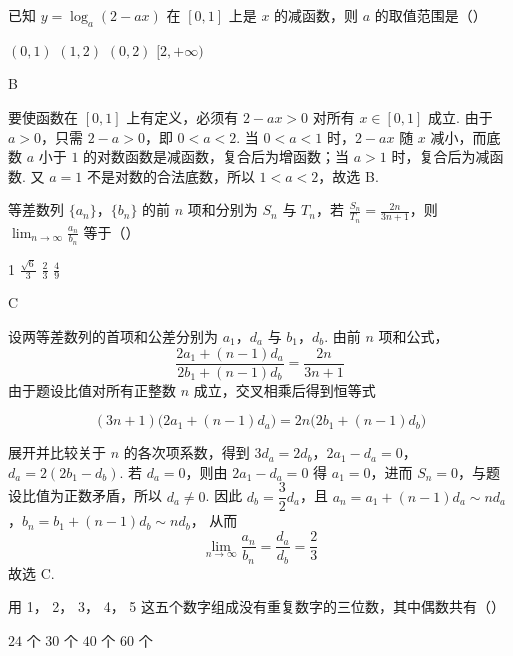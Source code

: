 \begin{problem}
已知 \(y = \log_a(2 - ax) \) 在 \([0,1]\) 上是 \(x \) 的减函数，则 \(a \) 的取值范围是（\quad）

\choices
    {\((0,1)\)}
    {\((1,2)\)}
    {\((0,2)\)}
    {\([2, +\infty)\)}
\end{problem}

\begin{answer}
B
\end{answer}

\begin{solution}
要使函数在 \([0,1]\) 上有定义，必须有 \(2-ax>0\) 对所有 \(x\in[0,1]\) 成立. 由于 \(a>0\)，只需 \(2-a>0\)，即 \(0<a<2\). 当 \(0<a<1\) 时，\(2-ax\) 随 \(x\) 减小，而底数 \(a\) 小于 \(1\) 的对数函数是减函数，复合后为增函数；当 \(a>1\) 时，复合后为减函数. 又 \(a=1\) 不是对数的合法底数，所以 \(1<a<2\)，故选 B.
\end{solution}

\begin{problem}
等差数列 \(\{a_{n}\}\)，\(\{b_{n}\}\) 的前 \(n\) 项和分别为 \(S_{n}\) 与 \(T_{n}\)，若 \(\frac{S_{n}}{T_{n}} = \frac{2n}{3n+1}\)，则 \(\displaystyle\lim_{n \to \infty} \frac{a_{n}}{b_{n}}\) 等于（\quad）

\choices
    {1}
    {\(\frac{\sqrt{6}}{3} \)}
    {\(\frac{2}{3} \)}
    {\(\frac{4}{9} \)}
\end{problem}

\begin{answer}
C
\end{answer}

\begin{solution}
设两等差数列的首项和公差分别为 \(a_1\)，\(d_a\) 与 \(b_1\)，\(d_b\). 由前 \(n\) 项和公式，
\[
\frac{2a_1+(n-1)d_a}{2b_1+(n-1)d_b}=\frac{2n}{3n+1}
\]
由于题设比值对所有正整数 \(n\) 成立，交叉相乘后得到恒等式

\[
(3n+1)\bigl(2a_1+(n-1)d_a\bigr)=2n\bigl(2b_1+(n-1)d_b\bigr)
\]

展开并比较关于 \(n\) 的各次项系数，得到
\(3d_a=2d_b\)，\(2a_1-d_a=0\)，\(d_a=2\left(2b_1-d_b\right)\).
若 \(d_a=0\)，则由 \(2a_1-d_a=0\) 得 \(a_1=0\)，进而 \(S_n=0\)，与题设比值为正数矛盾，所以 \(d_a\ne0\). 因此 \(d_b=\dfrac32d_a\)，且
\(a_n=a_1+(n-1)d_a\sim nd_a\)，\(b_n=b_1+(n-1)d_b\sim nd_b\)，
从而
\[
\lim_{n\to\infty}\frac{a_n}{b_n}=\frac{d_a}{d_b}=\frac23
\]
故选 C.
\end{solution}

\begin{problem}
用 1， 2， 3， 4， 5 这五个数字组成没有重复数字的三位数，其中偶数共有（\quad）

\choices
    {\(24\text{ 个}\)}
    {\(30\text{ 个}\)}
    {\(40\text{ 个}\)}
    {\(60\text{ 个}\)}
\end{problem}

